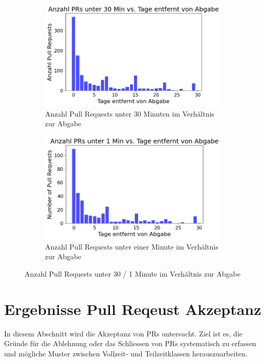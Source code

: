 \begin{figure}[htbp]
    \centering
    \begin{subfigure}[b]{0.48\textwidth}
        \centering
        \includegraphics[width=\textwidth]{Figures/anz-prs-under-30-min.png}
    \caption{Anzahl Pull Requests unter 30 Minuten im Verhältnis zur Abgabe}
    \label{fig:anz-prs-under-30-min}
    \end{subfigure}
    \hfill
    \begin{subfigure}[b]{0.48\textwidth}
        \centering
        \includegraphics[width=\textwidth]{Figures/anz-prs-under-1-min.png}
    \caption{Anzahl Pull Requests unter einer Minute im Verhältnis zur Abgabe}
    \label{fig:anz-prs-under-1-min}
    \end{subfigure}
    \caption{Anzahl Pull Requests unter 30 / 1 Minute im Verhältnis zur Abgabe}
    \label{fig:anz-prs-under-x-mins}
\end{figure}


\newpage
\section{Ergebnisse Pull Reqeust Akzeptanz}
In diesem Abschnitt wird die Akzeptanz von PRs untersucht. Ziel ist es, die Gründe für die Ablehnung oder das Schliessen von PRs systematisch zu erfassen und mögliche Muster zwischen Vollzeit- und Teilzeitklassen herauszuarbeiten.

